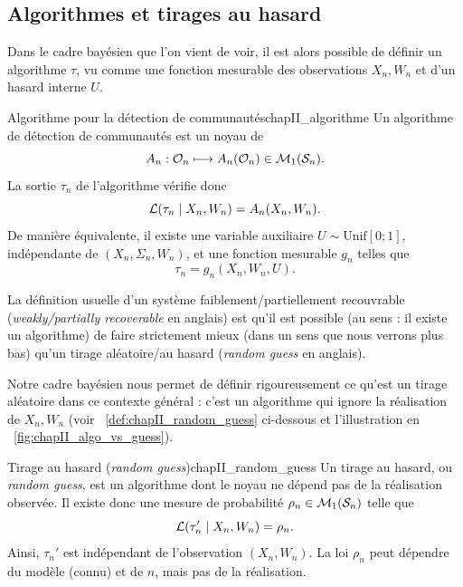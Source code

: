 \subsection{Algorithmes et tirages au hasard}

Dans le cadre bayésien que l'on vient de voir, il est alors possible de définir un algorithme $\tau$, vu comme une fonction mesurable des observations $X_n,W_n$ et d'un hasard interne $U$.

\begin{Definition}{Algorithme pour la détection de communautés}{chapII_algorithme}
Un algorithme de détection de communautés est un noyau de 
\[
    A_n:\mathcal O_n\longmapsto A_n(\mathcal O_n)\in \mathcal{M}_1(\mathcal S_n).
\]
La sortie $\tau_n$ de l'algorithme vérifie donc
\[
    \mathcal L(\tau_n\mid X_n,W_n)=A_n(X_n,W_n).
\]
De manière équivalente, il existe une variable auxiliaire $U\sim\mathrm{Unif}[0 ; 1]$, indépendante de $(X_n,\Sigma_n,W_n)$, et une fonction mesurable $g_n$ telles que
\[
    \tau_n=g_n(X_n,W_n,U).
\]
\end{Definition}

La définition usuelle d'un système faiblement/partiellement recouvrable (\emph{weakly/partially recoverable} en anglais) \cite{SankararamanBaccelli2018} est qu'il est possible (au sens : il existe un algorithme) de faire strictement mieux (dans un sens que nous verrons plus bas) qu'un tirage aléatoire/au hasard (\emph{random guess} en anglais).

Notre cadre bayésien nous permet de définir rigoureusement ce qu'est un tirage aléatoire dans ce contexte général : c'est un algorithme qui ignore la réalisation de $X_n, W_n$ (voir \Def~\ref{def:chapII_random_guess} ci-dessous et l'illustration en \Fig~\ref{fig:chapII_algo_vs_guess}).

\begin{Definition}{Tirage au hasard (\emph{random guess})}{chapII_random_guess}
Un tirage au hasard, ou \emph{random guess}, est un algorithme dont le noyau ne dépend pas de la réalisation observée. Il existe donc une mesure de probabilité $\rho_n\in\mathcal{M}_1(\mathcal S_n)$ telle que
\[
    \mathcal L(\tau_n'\mid X_n,W_n)=\rho_n.
\]
Ainsi, $\tau_n'$ est indépendant de l'observation $(X_n,W_n)$. La loi $\rho_n$ peut dépendre du modèle (connu) et de $n$, mais pas de la réalisation.
\end{Definition}

